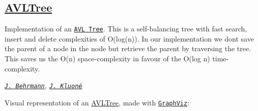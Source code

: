 \subsection*{\mbox{\hyperlink{classAVLTree}{A\+V\+L\+Tree}} \href{https://travis-ci.org/ob-algdati-ws17/blatt-7-aufgabe-1-p-p}{\tt }}

Implementation of an \href{https://en.wikipedia.org/wiki/AVL_tree}{\tt A\+VL Tree}. This is a self-\/balancing tree with fast search, insert and delete complexities of O(log(n)). In our implementation we don\textquotesingle{}t save the \textquotesingle{}parent\textquotesingle{} of a node in the node but retrieve the parent by traversing the tree. This saves us the O(n) space-\/complexity in favour of the O(log n) time-\/complexity.

{\itshape \href{https://github.com/jjxxs}{\tt J. Behrmann}, \href{https://github.com/JustinaKluone}{\tt J. Kluoné}}

Visual representation of an \mbox{\hyperlink{classAVLTree}{A\+V\+L\+Tree}}, made with \href{https://graphviz.gitlab.io/}{\tt Graph\+Viz}\+:  
